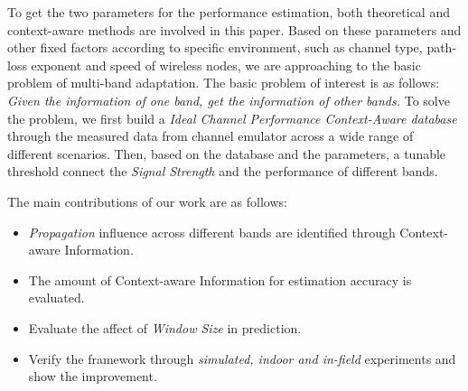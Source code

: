 To get the two parameters for the performance estimation, both theoretical and context-aware methods are involved in this paper. Based on these parameters and other fixed factors according to specific environment, such as channel type, path-loss exponent and speed of wireless nodes, we are approaching to the basic problem of multi-band adaptation. 
The basic problem of interest is as follows: \emph{Given the information of one band, get the information of other bands.}
To solve the problem, 
we first build a \emph{Ideal Channel Performance Context-Aware database} through the measured data from channel emulator across a wide range of different scenarios. 
Then, based on the database and the parameters, a tunable threshold connect the \emph{Signal Strength} and the performance of different bands.




The main contributions of our work are as follows:
\begin{itemize}
\item \emph{Propagation} influence across different bands are identified through Context-aware Information.
\item The amount of Context-aware Information for estimation accuracy is evaluated.
\item Evaluate the affect of \emph{Window Size} in prediction.
\item Verify the framework through \emph{simulated, indoor and in-field} experiments and show the improvement.
\end{itemize}




